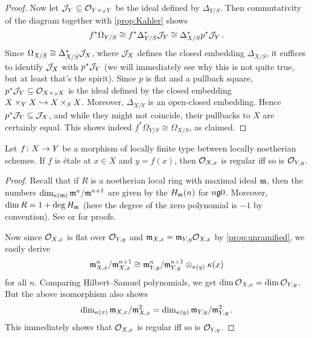 \begin{proof}
	Now let $\mathcal{J}_Y\subseteq \mathcal{O}_{Y\times_SY}$ be the ideal defined by $\Delta_{Y/S}$. Then commutativity of the diagram together with \cref{prop:Kahler} shows
	\begin{equation*}
		f^*\Omega_{Y/S}\cong f^*\Delta_{Y/S}^*\mathcal{J}_Y\cong \Delta_{X/S}^*p^*\mathcal{J}_Y\,.
	\end{equation*}
	Since $\Omega_{X/S}\cong \Delta_{X/S}^*\mathcal{J}_X$, where $\mathcal{J}_X$ defines the closed embedding $\Delta_{X/S}$, it suffices to identify $\mathcal{J}_X$ with $p^*\mathcal{J}_Y$ (we will immediately see why this is not quite true, but at least that's the spirit). Since $p$ is flat and \itememph{\boxtimes} a pullback square, $p^*\mathcal{J}_Y\subseteq \mathcal{O}_{X\times_SX}$ is the ideal defined by the closed embedding $X\times_YX\monomorphism X\times_SX$. Moreover, $\Delta_{X/Y}$ is an open-closed embedding. Hence $p^*\mathcal{J}_Y\subseteq \mathcal{J}_X$, and while they might not coincide, their pullbacks to $X$ are certainly equal. This shows indeed $f^*\Omega_{Y/S}\cong \Omega_{X/S}$, as claimed.
\end{proof}
\begin{prop}\label{prop:etaleRegular}
	Let $f\colon X\morphism Y$ be a morphism of locally finite type between locally noetherian schemes. If $f$ is étale at $x\in X$ and $y=f(x)$, then $\mathcal{O}_{X,x}$ is regular iff so is $\mathcal{O}_{Y,y}$.
\end{prop}
\begin{proof}
	Recall that if $R$ is a noetherian local ring with maximal ideal $\mathfrak{m}$, then the numbers $\dim_{\kappa(\mathfrak{m})}\mathfrak{m}^n/\mathfrak{m}^{n+1}$ are given by the  $H_{\mathfrak{m}}(n)$ for $n\gge 0$. Moreover, $\dim R=1+\deg H_{\mathfrak{m}}$ (here the degree of the zero polynomial is $-1$ by convention). See \cite[Chapter~12]{eisenbudCommAlg} or \cite[Theorem~20]{alg2} for proofs.
	
	Now since $\mathcal{O}_{X,x}$ is flat over $\mathcal{O}_{Y,y}$ and $\mathfrak{m}_{X,x}=\mathfrak{m}_{Y,y}\mathcal{O}_{X,x}$ by \cref{prop:unramified}, we easily derive
	\begin{equation*}
		\mathfrak{m}_{X,x}^n/\mathfrak{m}_{X,x}^{n+1}\cong \mathfrak{m}_{Y,y}^n/\mathfrak{m}_{Y,y}^{n+1}\otimes_{\kappa(y)}\kappa(x)
	\end{equation*}
	for all $n$. Comparing Hilbert--Samuel polynomials, we get $\dim \mathcal{O}_{X,x}=\dim\mathcal{O}_{Y,y}$. But the above isomorphism also shows
	\begin{equation*}
		\dim_{\kappa(x)}\mathfrak{m}_{X,x}/\mathfrak{m}_{X,x}^2=\dim_{\kappa(y)}\mathfrak{m}_{Y,y}/\mathfrak{m}_{Y,y}^2\,.
	\end{equation*}
	This immediately shows that $\mathcal{O}_{X,x}$ is regular iff so is $\mathcal{O}_{Y,y}$.
\end{proof}

